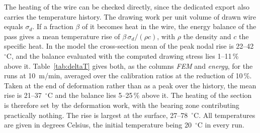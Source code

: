 \documentclass[subscriptcorrection,upint,varvw,barcolor=Goldenrod3,mathalfa=cal=euler,balance,hyphenate,french,pdf-a]{asmejour} %
\begin{document}
The heating of the wire can be checked directly, since the dedicated export also carries the
temperature history. The drawing work per unit volume of drawn wire equals $\sigma_d$. If a
fraction $\beta$ of it becomes heat in the wire, the energy balance of the pass gives a mean
temperature rise of $\beta\,\sigma_d/(\rho c)$, with $\rho$ the density and $c$ the specific heat.
In the model the cross-section mean of the peak nodal rise is 22--42~$^\circ$C, and the balance
evaluated with the computed drawing stress lies 1--11\,\% above it. Table~\ref{tab:deltaT} gives
both, as the columns \emph{FEM} and \emph{energy}, for the runs at 10~m/min, averaged over the
calibration ratios at the reduction of 10\,\%. Taken at the end of deformation rather than as a
peak over the history, the mean rise is 21--37~$^\circ$C and the balance lies 5--25\,\% above it.
The heating of the section is therefore set by the deformation work, with the bearing zone
contributing practically nothing. The rise is largest at the surface, 27--78~$^\circ$C. All
temperatures are given in degrees Celsius, the initial temperature being 20~$^\circ$C in every run.
\end{document}
